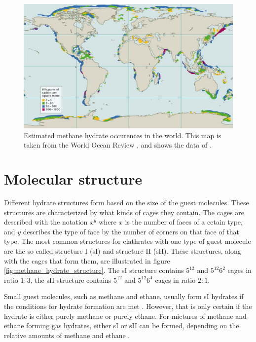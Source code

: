 \begin{figure}
\includegraphics[width=\textwidth]{../pictures/hydrate_map_nice.pdf}
\caption{Estimated methane hydrate occurences in the world. This map is taken from the World Ocean Review \cite{Bucker2014}, and shows the data of \citet{Wallmann2012}.}
\label{fig:hydrate_map}
\end{figure}

\section{Molecular structure}
Different hydrate structures form based on the size of the guest molecules. These structures are characterized by what kinds of cages they contain. The cages are described with the notation $x^y$ where $x$ is the number of faces of a cetain type, and $y$ describes the type of face by the number of corners on that face of that type. The most common structures for clathrates with one type of guest molecule are the so called structure I (sI) and structure II (sII). These structures, along with the cages that form them, are illustrated in figure \ref{fig:methane_hydrate_structure}. The sI structure contains $5^{12}$ and $5^{12}6^2$ cages in ratio $1:3$, the sII structure contains $5^{12}$ and $5^{12}6^4$ cages in ratio $2:1$.  

Small guest molecules, such as methane and ethane, usually form sI hydrates if the conditions for hydrate formation are met \cite{Hester2009}. However, that is only certain if the hydrate is either purely methane or purely ethane. For mictures of methane and ethane forming gas hydrates, either sI or sII can be formed, depending on the relative amounts of methane and ethane \cite{Subramanian20001981}. 

